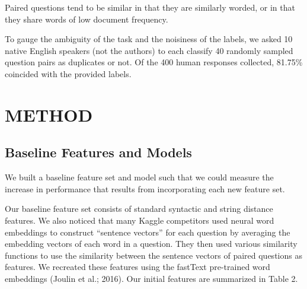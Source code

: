 \documentclass[letterpaper, 10 pt, conference]{ieeeconf}  %
\begin{document}
Paired questions tend to be similar in that they are similarly worded, or in that they share words of low document frequency.

To gauge the ambiguity of the task and the noisiness of the labels, we asked 10 native English speakers (not the authors) to each classify 40 randomly sampled question pairs as duplicates or not. Of the 400 human responses collected, 81.75\% coincided with the provided labels.


\section{METHOD}


\subsection{Baseline Features and Models} 

We built a baseline feature set and model such that we could measure the increase in performance that results from incorporating each new feature set.

Our baseline feature set consists of standard syntactic and string distance features. We also noticed that many Kaggle competitors used neural word embeddings to construct “sentence vectors” for each question by averaging the embedding vectors of each word in a question. They then used various similarity functions to use the similarity between the sentence vectors of paired questions as features. We recreated these features using the fastText pre-trained word embeddings (Joulin et al.; 2016). Our initial features are summarized in Table 2.
\end{document}
